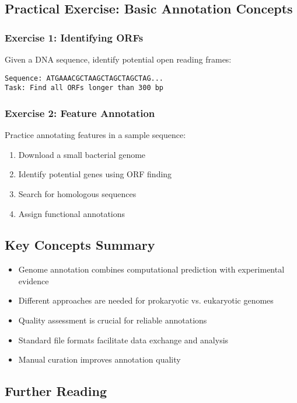 \subsection{Practical Exercise: Basic Annotation Concepts}

\subsubsection{Exercise 1: Identifying ORFs}
Given a DNA sequence, identify potential open reading frames:

\begin{verbatim}
Sequence: ATGAAACGCTAAGCTAGCTAGCTAG...
Task: Find all ORFs longer than 300 bp
\end{verbatim}

\subsubsection{Exercise 2: Feature Annotation}
Practice annotating features in a sample sequence:

\begin{enumerate}
    \item Download a small bacterial genome
    \item Identify potential genes using ORF finding
    \item Search for homologous sequences
    \item Assign functional annotations
\end{enumerate}

\subsection{Key Concepts Summary}

\begin{itemize}
    \item Genome annotation combines computational prediction with experimental evidence
    \item Different approaches are needed for prokaryotic vs. eukaryotic genomes
    \item Quality assessment is crucial for reliable annotations
    \item Standard file formats facilitate data exchange and analysis
    \item Manual curation improves annotation quality
\end{itemize}

\subsection{Further Reading}

